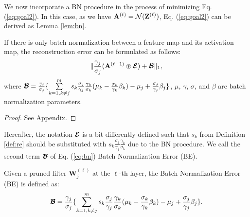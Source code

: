 We now incorporate a BN procedure in the process of minimizing Eq. (\ref{eq:goal2}). In this case, as we have $\mathbf{A}^{(\ell)} = \mathcal{N}(\mathbf{Z}^{(\ell)})$, Eq. (\ref{eq:goal2}) can be derived as Lemma \ref{lem:bn}.
\begin{lemma} \label{lem:bn}
If there is only batch normalization between a feature map and its activation map, the reconstruction error can be formulated as follows:
\begin{equation} \label{eq:bn}
\| \frac{\gamma_{j}}{\sigma_{j}}{(\mathbf{A}^{(\ell-1)} \circledast \boldsymbol{\mathcal{E}})} + \boldsymbol{\mathcal{B}}\|_{1},
\end{equation}
where $\boldsymbol{\mathcal{B}} = \frac{\gamma_{j}}{\sigma_{j}} 
 \{\sum\limits_{k = 1, k \neq j }^{m} s_{k}\frac{\sigma_{j}}{\gamma_{j}}\frac{\gamma_{k}}{\sigma_{k}} (\mu_{k} -  \frac{\sigma_{k}}{\gamma_{k}}\beta_k) - \mu_j + \frac{\sigma_{j}}{\gamma_{j}}\beta_j\}$, $\mu$, $\gamma$, $\sigma$, and $\beta$ are batch normalization parameters.
\end{lemma}
\begin{proof}
See Appendix.
\end{proof}
Hereafter, the notation $\boldsymbol{\mathcal{E}}$ is a bit differently defined such that $s_k$ from Definition \ref{def:re} should be substituted with $s_k \frac{\sigma_j}{\gamma_j} \frac{\gamma_k}{\sigma_k}$ due to the BN procedure. We call the second term $\boldsymbol{\mathcal{B}}$ of Eq. (\ref{eq:bn}) Batch Normalization Error (BE).

\begin{definition}
Given a pruned filter $\mathbf{W}_{j}^{(\ell)}$ at the $\ell$-th layer, the Batch Normalization Error (BE) is defined as:
$$
\boldsymbol{\mathcal{B}} = \frac{\gamma_{j}}{\sigma_{j}} 
\{\sum\limits_{k = 1, k \neq j }^{m} s_{k}\frac{\sigma_{j}}{\gamma_{j}}\frac{\gamma_{k}}{\sigma_{k}} (\mu_{k} -  \frac{\sigma_{k}}{\gamma_{k}}\beta_k) - \mu_j  + \frac{\sigma_{j}}{\gamma_{j}}\beta_j \}.
$$
\end{definition}



